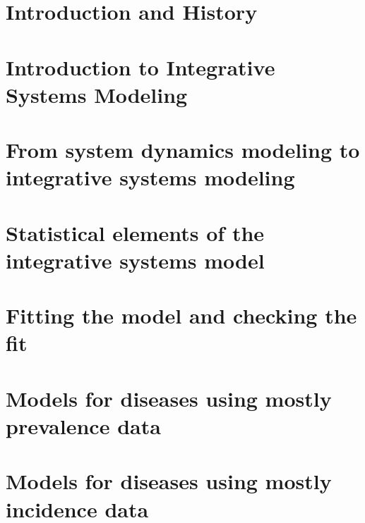 \chapter[Introduction]{Introduction and History}
\label{chapter:introduction}







\chapter[Introduction to ISM]{Introduction to Integrative Systems Modeling}
\label{chapter:theory-introduction}


\chapter[System dynamics model]{From system dynamics modeling to integrative systems modeling}
\label{chapter:system-dynamics}



\chapter[Statistical model]{Statistical elements of the integrative systems model}
\label{chapter:statistical-model}





\chapter[Model fitting]{Fitting the model and checking the fit}
\label{chapter:model-fitting}






\chapter[Mostly Prevalence]{Models for diseases using mostly prevalence data}
\label{chapter:practice-mostly_prevalence}


\chapter[Mostly Incidence]{Models for diseases using mostly incidence data}
\label{chapter:practice-mostly_incidence}


